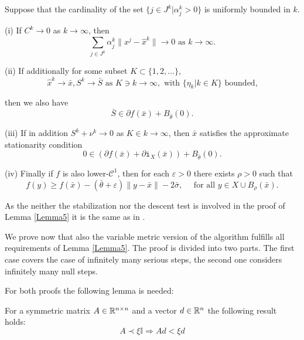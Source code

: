 \begin{lemma}\label{Lemma5}
	Suppose that the cardinality of the set \(\{j \in J^k| \alpha_j^k > 0\}\) is uniformly bounded in \(k\).
	
	(i) If \(C^k \to 0\) as \(k \to \infty\), then 
	\[ \sum_{j \in J^k}\alpha_j^k\|x^j-\hat{x}^k\| \to 0 \text{ as } k \to \infty. \]
	
	(ii) If additionally for some subset \(K \subset \{1,2,\dots\}\),
	\[\hat{x}^k \to \bar{x}, S^k \to \bar{S} \text{ as } K \ni k \to \infty, \text{ with } \{\eta_k|k \in K\} \text{ bounded,} \]
	
	then we also have 
	\[\bar{S} \in \partial f(\bar{x})+B_{\bar{\theta}}(0).\]
	
	(iii) If in addition \(S^k + \nu^k \to 0\) as \(K \in k \to \infty\), then \(\bar{x}\) satisfies the approximate stationarity condition 
	\begin{equation}
		0 \in \left(\partial f(\bar{x}) + \partial \mathtt{i}_X(\bar{x}) \right) + B_{\bar{\theta}}(0).
	\end{equation}
	
	(iv) Finally if \(f\) is also lower-\(\mathcal{C}^1\), then for each \(\varepsilon > 0\) there exists \(\rho > 0\) such that
	\begin{equation}
		f(y) \geq f(\bar{x})-(\bar{\theta}+\varepsilon)\|y-\bar{x}\|-2\bar{\sigma}, \quad \text{ for all } y \in X\cup B_{\rho}(\bar{x}).
	\end{equation}
\end{lemma}

As the neither the stabilization nor the descent test is involved in the proof of Lemma \ref{Lemma5} it is the same as in \cite{Hare2016}.

We prove now that also the variable metric version of the algorithm fulfills all requirements of Lemma \ref{Lemma5}.
The proof is divided into two parts. The first case covers the case of infinitely many serious steps, the second one considers infinitely many null steps.

For both proofs the following lemma is needed:

\begin{lemma}
	For a symmetric matrix \(A \in \mathbb{R}^{n\times n}\) and a vector \(d\in \mathbb{R}^n\) the following result holds: 
	\[ A \prec \xi \mathbb{I} \Rightarrow Ad < \xi d \]
\end{lemma}

